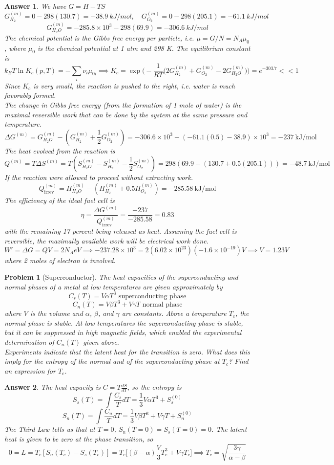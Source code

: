\documentclass[a4paper]{article}
\newtheorem{ans}{Answer}[section]
\theoremstyle{new}
\newtheorem{qns}{Problem}[section]
\begin{document}
\begin{ans}
We have $G=H-TS$
$$G_{H_2}^{(m)}=0-298(130.7)=-38.9~kJ/mol,\quad G_{O_2}^{(m)}=0-298(205.1)=-61.1~kJ/mol$$
$$G_{H_2O}^{(m)}=-285.8\times10^3-298(69.9)=-306.6~kJ/mol$$
The chemical potential is the Gibbs free energy per particle, i.e. $\mu=G/N=N_A\mu_0$, where $\mu_0$ is the chemical potential at 1 atm and 298 K. The equilibrium constant is
$$k_BT\ln K_c(p,T)=-\sum_i\nu_i\mu_{0i}\implies K_c=\exp\bigg(-\frac{1}{RT}\bigg(2G_{H_2}^{(m)}+G_{O_2}^{(m)}-2G_{H_2O}^{(m)}\bigg)\bigg)=e^{-303.7}<<1$$
Since $K_c$ is very small, the reaction is pushed to the right, i.e. water is much favorably formed.\\[5pt]
The change in Gibbs free energy (from the formation of 1 mole of water) is the maximal reversible work that can be done by the system at the same pressure and temperature. 
$$\Delta G^{(m)}=G^{(m)}_{H_2O}-(G_{H_2}^{(m)}+\frac{1}{2}G_{O_2}^{(m)})=-306.6\times10^3-(-61.1(0.5)-38.9)\times10^3=-237~\text{kJ/mol}$$
The heat evolved from the reaction is
$$Q^{(m)}=T\Delta S^{(m)}=T(S_{H_2O}^{(m)}-S_{H_2}^{(m)}-\frac{1}{2}S_{O_2}^{(m)})=298(69.9-(130.7+0.5(205.1)))=-48.7~\text{kJ/mol}$$
If the reaction were allowed to proceed without extracting work. 
$$Q_{\text{irrev}}^{(m)}=H_{H_2O}^{(m)}-(H_{H_2}^{(m)}+0.5H_{O_2}^{(m)})=-285.58~\text{kJ/mol}$$
The efficiency of the ideal fuel cell is
$$\eta=\frac{\Delta G^{(m)}}{Q_{\text{irrev}}^{(m)}}=\frac{-237}{-285.58}=0.83$$
with the remaining 17 percent being released as heat. Assuming the fuel cell is reversible, the maximally available work will be electrical work done.
$$W'=\Delta G=QV=2N_AeV\implies-237.28\times10^3=2(6.02\times10^{23})(-1.6\times10^{-19})V\implies V=1.23V$$
where 2 moles of electron is involved.
\end{ans}
\newpage
\begin{qns}[Superconductor]
The heat capacities of the superconducting and normal phases of a metal at low temperatures are given approximately by
$$C_s(T)=V\alpha T^3\text{ superconducting phase}$$
$$C_n(T)=V\beta T^3+V\gamma T\text{ normal phase}$$
where $V$ is the volume and $\alpha$, $\beta$, and $\gamma$ are constants. Above a temperature $T_c$, the normal phase is stable. At low temperatures the superconducting phase is stable, but it can be suppressed in high magnetic fields, which enabled the experimental determination of $C_n(T)$ given above.\\[5pt]
Experiments indicate that the latent heat for the transition is zero. What does this imply for the entropy of the normal and of the superconducting phase at $T_c$? Find an expression for $T_c$.
\end{qns}
\begin{ans}
The heat capacity is $C=T\frac{dS}{dT}$, so the entropy is
$$S_{s}(T)=\int\frac{C_{s}}{T}dT=\frac{1}{3}V\alpha T^3+S^{(0)}_{s}$$
$$S_{n}(T)=\int\frac{C_{n}}{T}dT=\frac{1}{3}V\beta T^3+V\gamma T+S^{(0)}_{n}$$
The Third Law tells us that at $T=0$, $S_n(T=0)=S_s(T=0)=0$. The latent heat is given to be zero at the phase transition, so
$$0=L=T_c[S_n(T_c)-S_s(T_c)]=T_c\bigg[(\beta-\alpha)\frac{V}{3}T_c^3+V\gamma T_c\bigg]\implies T_c=\sqrt{\frac{3\gamma}{\alpha-\beta}}$$
\end{ans}
\newpage
\end{document}
